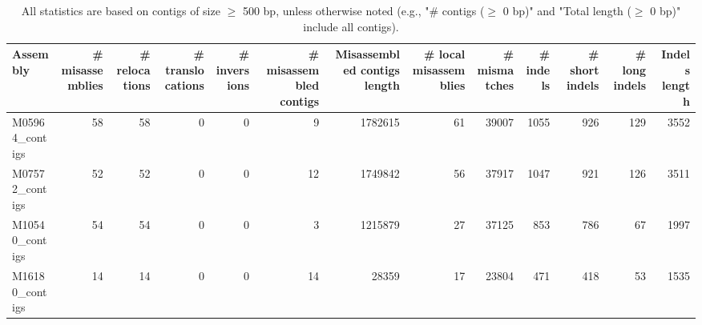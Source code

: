 \documentclass[12pt,a4paper]{article}
\begin{document}
\begin{table}[ht]
\begin{center}
\caption{All statistics are based on contigs of size $\geq$ 500 bp, unless otherwise noted (e.g., "\# contigs ($\geq$ 0 bp)" and "Total length ($\geq$ 0 bp)" include all contigs).}
\begin{tabular}{|l*{12}{|r}|}
\hline
Assembly & \# misassemblies &     \# relocations &     \# translocations &     \# inversions & \# misassembled contigs & Misassembled contigs length & \# local misassemblies & \# mismatches & \# indels &     \# short indels &     \# long indels & Indels length \\ \hline
M05964\_contigs & 58 & 58 & 0 & 0 & 9 & 1782615 & 61 & 39007 & 1055 & 926 & 129 & 3552 \\ \hline
M07572\_contigs & 52 & 52 & 0 & 0 & 12 & 1749842 & 56 & 37917 & 1047 & 921 & 126 & 3511 \\ \hline
M10540\_contigs & 54 & 54 & 0 & 0 & 3 & 1215879 & 27 & 37125 & 853 & 786 & 67 & 1997 \\ \hline
M16180\_contigs & 14 & 14 & 0 & 0 & 14 & 28359 & 17 & 23804 & 471 & 418 & 53 & 1535 \\ \hline
\end{tabular}
\end{center}
\end{table}
\end{document}
